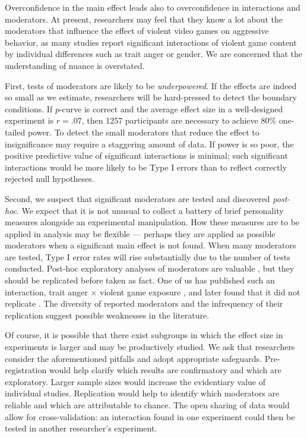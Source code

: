 \documentclass[man]{apa6}
\begin{document}
Overconfidence in the main effect leads also to overconfidence in interactions and moderators.  At present, researchers may feel that they know a lot about the moderators that influence the effect of violent video games on aggressive behavior, as many studies report significant interactions of violent game content by individual differences such as trait anger or gender. We are concerned that the understanding of nuance is overstated. 

First, tests of moderators are likely to be {\em underpowered}. If the effects are indeed so small as we estimate, researchers will be hard-pressed to detect the boundary conditions. If $p$-curve is correct and the average effect size in a well-designed experiment is $r = .07$, then 1257 participants are necessary to achieve $80\%$ one-tailed power. To detect the small moderators that reduce the effect to insignificance may require a staggering amount of data. If power is so poor, the positive predictive value of significant interactions is minimal; such significant interactions would be more likely to be Type I errors than to reflect correctly rejected null hypotheses. 

Second, we suspect that significant moderators are tested and discovered {\em post-hoc}. We expect that it is not unusual to collect a battery of brief personality measures alongside an experimental manipulation. How these measures are to be applied in analysis may be flexible --- perhaps they are applied as possible moderators when a significant main effect is not found. When many moderators are tested, Type I error rates will rise substantially due to the number of tests conducted. Post-hoc exploratory analyses of moderators are valuable \citep[indeed, we have presented them ourselves in the past,][]{Engelhardt:etal:2015a}, but they should be replicated before taken as fact. %
One of us has published such an interaction, trait anger $\times$ violent game exposure \citep{Engelhardt:etal:2011a}, and later found that it did not replicate \citep{Engelhardt:etal:inprep}. The diversity of reported moderators and the infrequency of their replication suggest possible weaknesses in the literature. 

Of course, it is possible that there exist subgroups in which the effect size in experiments is larger and may be productively studied. We ask that researchers consider the aforementioned pitfalls and adopt appropriate safeguards. Pre-registration would help clarify which results are confirmatory and which are exploratory. Larger sample sizes would increase the evidentiary value of individual studies. Replication would help to identify which moderators are reliable and which are attributable to chance. The open sharing of data would allow for cross-validation: an interaction found in one experiment could then be tested in another researcher's experiment.
\end{document}
